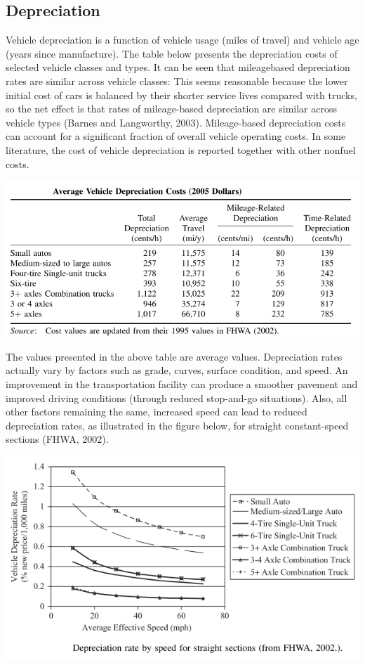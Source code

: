 \subsection{Depreciation}
Vehicle depreciation is a function of vehicle usage (miles of travel) and vehicle age (years since manufacture). The table below presents the depreciation costs of selected vehicle classes and types. It can be seen that mileagebased depreciation rates are similar across vehicle classes: This seems reasonable because the lower initial cost of cars is balanced by their shorter service lives compared with trucks, so the net effect is that rates of mileage-based depreciation are similar across vehicle types (Barnes and Langworthy, 2003). Mileage-based depreciation costs can account for a significant fraction of overall vehicle operating costs. In some literature, the cost of vehicle depreciation is reported together with other nonfuel costs.
\begin{center}
	\includegraphics[scale=0.65]{gfx/fig63.png}
\end{center}
The values presented in the above table are average values. Depreciation rates actually vary by factors such as grade, curves, surface condition, and speed. An improvement in the transportation facility can produce a smoother pavement and improved driving conditions (through reduced stop-and-go situations). Also, all other factors remaining the same, increased speed can lead to reduced depreciation rates, as illustrated in the figure below, for straight constant-speed sections (FHWA, 2002).
\begin{center}
	\includegraphics[scale=0.65]{gfx/fig64.png}
\end{center}
